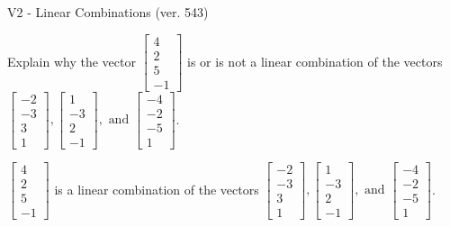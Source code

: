 \begin{exercise}
  \begin{exerciseTitle}V2 - Linear Combinations (ver. 543)\end{exerciseTitle}
  \begin{exerciseStatement}
    Explain why the vector \(\left[\begin{array}{c}
4 \\
2 \\
5 \\
-1
\end{array}\right]\)  is or is not a linear 
	combination of the vectors \(\left[\begin{array}{c}
-2 \\
-3 \\
3 \\
1
\end{array}\right] , \left[\begin{array}{c}
1 \\
-3 \\
2 \\
-1
\end{array}\right] , \text{ and } \left[\begin{array}{c}
-4 \\
-2 \\
-5 \\
1
\end{array}\right]\).
	


  \end{exerciseStatement}
  \begin{exerciseAnswer}
   \(\left[\begin{array}{c}
4 \\
2 \\
5 \\
-1
\end{array}\right]\) 
  	 is  
	a linear combination of the vectors \(\left[\begin{array}{c}
-2 \\
-3 \\
3 \\
1
\end{array}\right] , \left[\begin{array}{c}
1 \\
-3 \\
2 \\
-1
\end{array}\right] , \text{ and } \left[\begin{array}{c}
-4 \\
-2 \\
-5 \\
1
\end{array}\right]\).

	
  


  \end{exerciseAnswer}
\end{exercise}